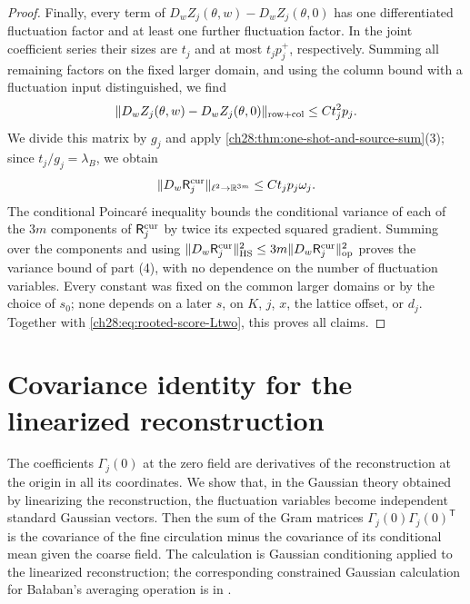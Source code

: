 \begin{proof}
Finally, every term of $D_wZ_j(\theta,w)-D_wZ_j(\theta,0)$ has one differentiated fluctuation factor and at least one further fluctuation factor. In the joint coefficient series their sizes are $t_j$ and at most $t_jp_j^+$, respectively. Summing all remaining factors on the fixed larger domain, and using the column bound with a fluctuation input distinguished, we find
\[
 \|D_wZ_j(\theta,w)-D_wZ_j(\theta,0)\|_{\rm row+col}\le Ct_j^2p_j.
\]
We divide this matrix by $g_j$ and apply \cref{ch28:thm:one-shot-and-source-sum}(3); since $t_j/g_j=\lambda_B$, we obtain
\[
 \|D_w\mathsf R_j^{\rm cur}\|_{\ell^2\to\mathbb R^{3m}}\le Ct_jp_j\omega_j.
\]
The conditional Poincaré inequality bounds the conditional variance of each of the $3m$ components of $\mathsf R_j^{\rm cur}$ by twice its expected squared gradient. Summing over the components and using $\|D_w\mathsf R_j^{\rm cur}\|_{\rm HS}^2\le3m\|D_w\mathsf R_j^{\rm cur}\|_{\rm op}^2$ proves the variance bound of part (4), with no dependence on the number of fluctuation variables. Every constant was fixed on the common larger domains or by the choice of $s_0$; none depends on a later $s$, on $K$, $j$, $x$, the lattice offset, or $d_j$. Together with \eqref{ch28:eq:rooted-score-Ltwo}, this proves all claims.
\end{proof}

\section{Covariance identity for the linearized reconstruction}\label{ch28:sec:covariance}

The coefficients $\Gamma_j(0)$ at the zero field are derivatives of the reconstruction at the origin in all its coordinates. We show that, in the Gaussian theory obtained by linearizing the reconstruction, the fluctuation variables become independent standard Gaussian vectors. Then the sum of the Gram matrices $\Gamma_j(0)\Gamma_j(0)^{\mathsf T}$ is the covariance of the fine circulation minus the covariance of its conditional mean given the coarse field. The calculation is Gaussian conditioning applied to the linearized reconstruction; the corresponding constrained Gaussian calculation for Bałaban's averaging operation is in \cite[Section~D, (1.47)--(1.49), p.~26, and (1.64)--(1.67), p.~29]{Balaban1984I}.

